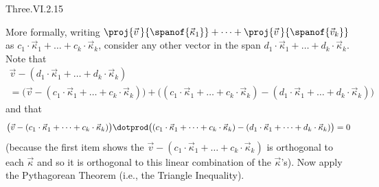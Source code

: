 \begin{ans}{Three.VI.2.15}
\begin{exparts}
            More formally, writing  $\proj{\vec{v}\,}{\spanof{\vec{\kappa}_1}}
                 +\dots+\proj{\vec{v}\,}{\spanof{\vec{v}_k}}$ as
            $c_1\cdot\vec{\kappa}_1+\dots+c_k\cdot\vec{\kappa}_k$,
            consider any other vector in the span
            $d_1\cdot\vec{\kappa}_1+\dots+d_k\cdot\vec{\kappa}_k$.
            Note that
            \begin{multline*}
              \vec{v}-(d_1\cdot\vec{\kappa}_1+\dots+d_k\cdot\vec{\kappa}_k)  \\
              =
              \bigl(\vec{v}
                    -(c_1\cdot\vec{\kappa}_1+\dots+c_k\cdot\vec{\kappa}_k)
              \bigr)
              +\bigl((c_1\cdot\vec{\kappa}_1+\dots+c_k\cdot\vec{\kappa}_k)
                     -(d_1\cdot\vec{\kappa}_1+\dots+d_k\cdot\vec{\kappa}_k)
               \bigr)
            \end{multline*}
            and that
            \begin{equation*}
              \bigl(\vec{v}
                 -(c_1\cdot\vec{\kappa}_1+\dots+c_k\cdot\vec{\kappa}_k)
              \bigr)
              \dotprod
              \bigl((c_1\cdot\vec{\kappa}_1+\dots+c_k\cdot\vec{\kappa}_k)
                     -(d_1\cdot\vec{\kappa}_1+\dots+d_k\cdot\vec{\kappa}_k)
              \bigr)
              =0
            \end{equation*}
            (because the first item shows the $\vec{v}
                 -(c_1\cdot\vec{\kappa}_1+\dots+c_k\cdot\vec{\kappa}_k)$
            is orthogonal to each $\vec{\kappa}$ and so it is orthogonal
            to this linear combination of the $\vec{\kappa}$'s).
            Now apply the Pythagorean Theorem (i.e., the Triangle Inequality).
       \end{exparts}
     
\end{ans}
